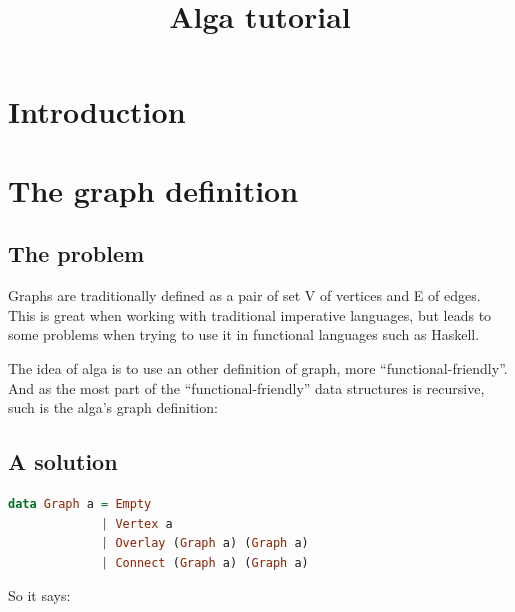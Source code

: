 \documentclass[10pt,a4paper]{article}
\title{Alga tutorial}
\date{}
\begin{document}
\maketitle

\section{Introduction}


\section{The graph definition}
\subsection{The problem}
Graphs are traditionally defined as a pair of set V of vertices and E of edges. This is great when working with traditional imperative languages, but leads to some problems when trying to use it in functional languages such as Haskell.

The idea of alga is to use an other definition of graph, more “functional-friendly”. And as the most part of the “functional-friendly” data structures is recursive, such is the alga’s graph definition:

\subsection{A solution}
\begin{lstlisting}[language=Haskell, frame=single]
data Graph a = Empty
             | Vertex a
             | Overlay (Graph a) (Graph a)
             | Connect (Graph a) (Graph a)
\end{lstlisting}

So it says:
\end{document}
